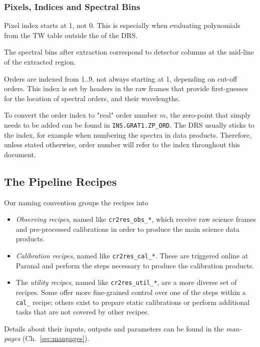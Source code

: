 \subsubsection{Pixels, Indices and Spectral Bins}
Pixel index starts at 1, not 0. This is especially when evaluating polynomials
from the TW table outside the of the DRS.

The spectral bins after extraction correspond to detector columns at the
mid-line of the extracted region.

Orders are indexed from 1..9, not always starting at 1, depending on cut-off
orders. This index is set by headers in the raw frames that provide first-guesses
for the location of spectral orders, and their wavelengths.

To convert the order index to "real" order number $m$, the zero-point that
simply needs to be added can be found in \texttt{INS.GRAT1.ZP\_ORD}. The DRS
usually sticks to the index, for example when numbering the spectra in data
products. Therefore, unless stated otherwise, order number will refer to the
index throughout this document.

\subsection{The Pipeline Recipes}
\label{sec:recipes-quick}

Our naming convention groups the recipes into
\begin{itemize}
    \item \textit{Observing recipes}, named like \texttt{cr2res\_obs\_*}, which
    receive raw science frames and pre-processed calibrations in order to
    produce the main science data products.
    \item \textit{Calibration recipes}, named like \texttt{cr2res\_cal\_*}.
    These are triggered online at Paranal and perform the steps necessary to
    produce the calibration products.
    \item The \textit{utility recipes}, named like \texttt{cr2res\_util\_*}, are
    a more diverse set of recipes. Some offer more fine-grained control over one
    of the steps within a \texttt{cal\_} recipe; others exist to prepare static
    calibrations or perform additional tasks that are not covered by other
    recipes.
\end{itemize}

Details about their inputs, outputs and parameters can be found in the
\emph{man-pages} (Ch.~\ref{sec:manpages}).

